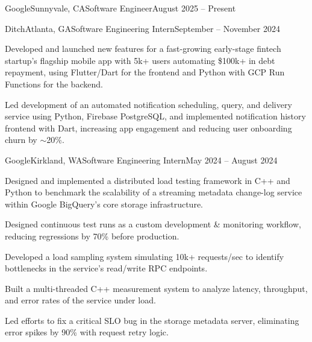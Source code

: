 \documentclass{article}
\begin{document}
\thispagestyle{empty}


\begin{flushleft}



    \begin{experiencenolist}{Google}{Sunnyvale, CA}{Software Engineer}{August 2025 -- Present}\end{experiencenolist}

    \begin{experience}{Ditch}{Atlanta, GA}{Software Engineering Intern}{September -- November 2024}
        \item Developed and launched new features for a fast-growing early-stage fintech startup's flagship mobile app with 5k+ users automating \$100k+ in debt repayment, using Flutter/Dart for the frontend and Python with GCP Run Functions for the backend.
        \item Led development of an automated notification scheduling, query, and delivery service using Python, Firebase PostgreSQL, and implemented notification history frontend with Dart, increasing app engagement and reducing user onboarding churn by $\sim$20\%.
    \end{experience}

    \begin{experience}{Google}{Kirkland, WA}{Software Engineering Intern}{May 2024 -- August 2024}
        \item Designed and implemented a distributed load testing framework in C++ and Python to benchmark the scalability of a streaming metadata change-log service within Google BigQuery's core storage infrastructure.
        \item Designed continuous test runs as a custom development \& monitoring workflow, reducing regressions by 70\% before production.
        \item Developed a load sampling system simulating 10k+ requests/sec to identify bottlenecks in the service's read/write RPC endpoints.
        \item Built a multi-threaded C++ measurement system to analyze latency, throughput, and error rates of the service under load.
        \item Led efforts to fix a critical SLO bug in the storage metadata server, eliminating error spikes by 90\% with request retry logic.
    \end{experience}


\end{flushleft}
\end{document}
